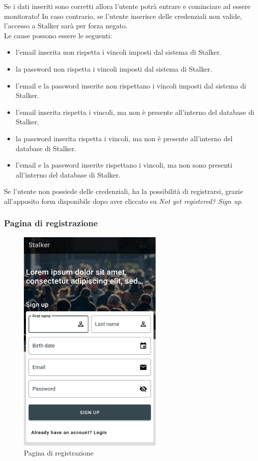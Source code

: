 \documentclass[../manuale-utente.tex]{subfiles}
\begin{document}
Se i dati inseriti sono corretti allora l'utente potrà entrare e cominciare ad essere monitorato!
In caso contrario, se l'utente inserisce delle credenziali non valide, l'accesso a Stalker sarà per forza negato.\\
Le cause possono essere le seguenti:
\begin{itemize}
    \item l'email inserita non rispetta i vincoli imposti dal sistema di Stalker.
    \item la password non rispetta i vincoli imposti dal sistema di Stalker.
    \item l'email e la password inserite non rispettano i vincoli imposti dal sistema di Stalker.
    \item l'email inserita rispetta i vincoli, ma non è presente all'interno del database di Stalker.
    \item la password inserita rispetta i vincoli, ma non è presente all'interno del database di Stalker.
    \item l'email e la password inserite rispettano i vincoli, ma non sono presenti all'interno del database di Stalker.
\end{itemize}

Se l'utente non possiede delle credenziali, ha la possibilità di registrarsi, grazie all'apposito form disponibile dopo aver cliccato su \textit{Not yet registered? Sign up}.
\newpage

\subsubsection{Pagina di registrazione}%
\label{sub:pagina_di_registrazione}

\begin{figure}[H]
    \centering
    \includegraphics[width=70mm]{img/mobile-app/pagina-di-registrazione.jpg}
    \caption{Pagina di registrazione}%
    \label{fig:mobile_app_pagina_di_registrazione}
\end{figure}
\end{document}
